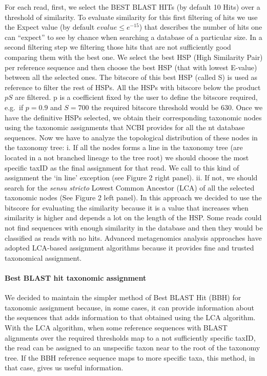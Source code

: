 \documentclass[fontsize=8pt,paper=a4,pagesize,abstracton]{scrartcl}
\begin{document}
For each read, first, we select the BEST BLAST HITs (by default 10 Hits)
over a threshold of similarity. To evaluate similarity for this first
filtering of hits we use the Expect value (by default
\(evalue \leq e^{-15}\)) that describes the number of hits one can
``expect'' to see by chance when searching a database of a particular
size. In a second filtering step we filtering those hits that are not
sufficiently good comparing them with the best one. We select the best
HSP (High Similarity Pair) per reference sequence and then choose the
best HSP (that with lowest E-value) between all the selected ones. The
bitscore of this best HSP (called S) is used as reference to filter the
rest of HSPs. All the HSPs with bitscore below the product \(p S\) are
filtered. p is a coefficient fixed by the user to define the bitscore
required, e.g.~if \(p=0.9\) and \(S=700\) the required bitscore
threshold would be \(630\). Once we have the definitive HSPs selected,
we obtain their corresponding taxonomic nodes using the taxonomic
assignments that NCBI provides for all the nt database sequences. Now we
have to analyze the topological distribution of these nodes in the
taxonomy tree: i. If all the nodes forms a line in the taxonomy tree
(are located in a not branched lineage to the tree root) we should
choose the most specific taxID as the final assignment for that read. We
call to this kind of assignment the `in line' exception (see Figure 2
right panel). ii. If not, we should search for the \emph{sensu stricto}
Lowest Common Ancestor (LCA) of all the selected taxonomic nodes (See
Figure 2 left panel). In this approach we decided to use the bitscore
for evaluating the similarity because it is a value that increases when
similarity is higher and depends a lot on the length of the HSP. Some
reads could not find sequences with enough similarity in the database
and then they would be classified as reads with no hits. Advanced
metagenomics analysis approaches \autocite{huson2012microbial} have
adopted LCA-based assignment algorithms because it provides fine and
trusted taxonomical assignment.

\paragraph{Best BLAST hit taxonomic
assignment}\label{best-blast-hit-taxonomic-assignment}

We decided to maintain the simpler method of Best BLAST Hit (BBH) for
taxonomic assignment because, in some cases, it can provide information
about the sequences that adds information to that obtained using the LCA
algorithm. With the LCA algorithm, when some reference sequences with
BLAST alignments over the required thresholds map to a not sufficiently
specific taxID, the read can be assigned to an unspecific taxon near to
the root of the taxonomy tree. If the BBH reference sequence maps to
more specific taxa, this method, in that case, gives us useful
information.
\end{document}
